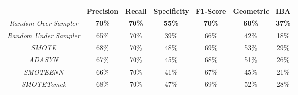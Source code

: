 \begin{table}[H]
	\centering
	\begin{tabular}{@{}ccccccc@{}}
		\toprule
		& \textbf{Precision} & \textbf{Recall} & \textbf{Specificity} & \textbf{F1-Score} & \textbf{Geometric} & \textbf{IBA}  \\ \midrule
		\textit{Random Over Sampler}  & \textbf{70\%}      & \textbf{70\%}   & \textbf{55\%}        & \textbf{70\%}     & \textbf{60\%}      & \textbf{37\%} \\
		\textit{Random Under Sampler} & 65\%               & 70\%            & 39\%                 & 66\%              & 42\%               & 18\%          \\
		\textit{SMOTE}                & 68\%               & 70\%            & 48\%                 & 69\%              & 53\%               & 29\%          \\
		\textit{ADASYN}               & 67\%               & 70\%            & 45\%                 & 68\%              & 51\%               & 26\%          \\
		\textit{SMOTEENN}             & 66\%               & 70\%            & 41\%                 & 67\%              & 45\%               & 21\%          \\
		\textit{SMOTETomek}           & 68\%               & 70\%            & 47\%                 & 69\%              & 52\%               & 28\%          \\ \bottomrule
	\end{tabular}
\end{table}

